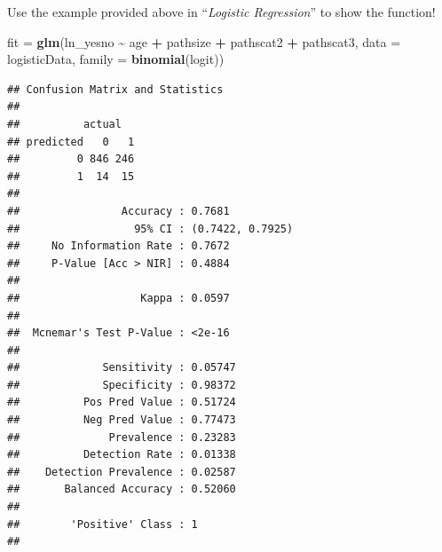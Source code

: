 \documentclass[
]{ctexart}
\newenvironment{Shaded}{\begin{snugshade}}{\end{snugshade}}
\newcommand{\AttributeTok}[1]{\textcolor[rgb]{0.13,0.29,0.53}{#1}}
\newcommand{\DecValTok}[1]{\textcolor[rgb]{0.00,0.00,0.81}{#1}}
\newcommand{\FunctionTok}[1]{\textcolor[rgb]{0.13,0.29,0.53}{\textbf{#1}}}
\newcommand{\NormalTok}[1]{#1}
\newcommand{\OtherTok}[1]{\textcolor[rgb]{0.56,0.35,0.01}{#1}}
\newcommand{\SpecialCharTok}[1]{\textcolor[rgb]{0.81,0.36,0.00}{\textbf{#1}}}
\newcommand{\StringTok}[1]{\textcolor[rgb]{0.31,0.60,0.02}{#1}}
\begin{document}
Use the example provided above in ``\emph{Logistic Regression}'' to show
the function!

\begin{Shaded}
\begin{Highlighting}[]
\NormalTok{fit }\OtherTok{=} \FunctionTok{glm}\NormalTok{(ln\_yesno }\SpecialCharTok{\textasciitilde{}}\NormalTok{ age }\SpecialCharTok{+}\NormalTok{ pathsize }\SpecialCharTok{+}\NormalTok{ pathscat2 }\SpecialCharTok{+}\NormalTok{ pathscat3,}
          \AttributeTok{data =}\NormalTok{ logisticData,}
          \AttributeTok{family =} \FunctionTok{binomial}\NormalTok{(}\StringTok{\textquotesingle{}logit\textquotesingle{}}\NormalTok{))}
\end{Highlighting}
\end{Shaded}

\begin{Shaded}
\end{Shaded}

\begin{verbatim}
## Confusion Matrix and Statistics
## 
##          actual
## predicted   0   1
##         0 846 246
##         1  14  15
##                                           
##                Accuracy : 0.7681          
##                  95% CI : (0.7422, 0.7925)
##     No Information Rate : 0.7672          
##     P-Value [Acc > NIR] : 0.4884          
##                                           
##                   Kappa : 0.0597          
##                                           
##  Mcnemar's Test P-Value : <2e-16          
##                                           
##             Sensitivity : 0.05747         
##             Specificity : 0.98372         
##          Pos Pred Value : 0.51724         
##          Neg Pred Value : 0.77473         
##              Prevalence : 0.23283         
##          Detection Rate : 0.01338         
##    Detection Prevalence : 0.02587         
##       Balanced Accuracy : 0.52060         
##                                           
##        'Positive' Class : 1               
## 
\end{verbatim}
\end{document}

